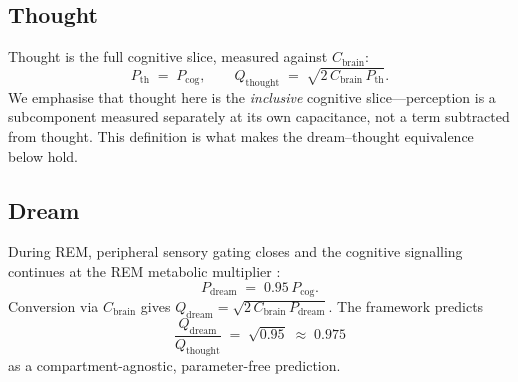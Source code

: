 \documentclass[11pt,twocolumn,a4paper]{article}
\theoremstyle{definition}
\theoremstyle{remark}
\newcommand{\Qth}{Q_{\mathrm{thought}}}
\newcommand{\Qdr}{Q_{\mathrm{dream}}}
\newcommand{\Pcog}{P_{\mathrm{cog}}}
\newcommand{\Pth}{P_{\mathrm{th}}}
\newcommand{\Pdr}{P_{\mathrm{dream}}}
\newcommand{\Cbrain}{C_{\mathrm{brain}}}
\begin{document}
\subsection{Thought}

Thought is the full cognitive slice, measured against $\Cbrain$:
\begin{equation}
\Pth \;=\; \Pcog,\qquad \Qth \;=\; \sqrt{2\,\Cbrain\,\Pth}.
\label{eq:Qthought}
\end{equation}
We emphasise that thought here is the \emph{inclusive} cognitive
slice---perception is a subcomponent measured separately at its own
capacitance, not a term subtracted from thought. This definition is
what makes the dream--thought equivalence below hold.

\subsection{Dream}

During REM, peripheral sensory gating closes
\citep{llinas1993,rechtschaffen1968} and the cognitive signalling
continues at the REM metabolic multiplier
\citep{maquet1990,madsen1991}:
\begin{equation}
\Pdr \;=\; 0.95\,\Pcog.
\label{eq:Pdream}
\end{equation}
Conversion via $\Cbrain$ gives
$\Qdr = \sqrt{2\,\Cbrain\,\Pdr}$. The framework predicts
\begin{equation}
\boxed{\;\frac{\Qdr}{\Qth} \;=\; \sqrt{0.95} \;\approx\; 0.975\;}
\end{equation}
as a compartment-agnostic, parameter-free prediction.
\end{document}
